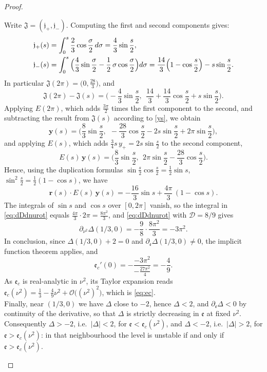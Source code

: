 \documentclass[10pt,a4paper]{amsart}
\newcommand{\D}{\mathcal{D}}
\newcommand{\ee}{\mathfrak{e}}
\begin{document}
\begin{proof}
\begin{enumerate}
\begin{itemize}
Write $\boldsymbol{\mathfrak{J}}=(\mathfrak{j}_+, \mathfrak{j}_-)$. Computing the first and second components gives:
\[
\begin{aligned}
\mathfrak{j}_+(s)&=\int_0^s\frac{2}{3}\cos\frac{\sigma}{2}\,{\rm d}\sigma=\frac{4}{3}\sin\frac{s}{2},\\
\mathfrak{j}_-(s)
&=\int_0^s\Big( \frac{4}{3}\sin\frac{\sigma}{2}-\frac{1}{2}\,\sigma\cos\frac{\sigma}{2}\Big){\rm d}\sigma=\frac{14}{3}\Big(1-\cos\frac{s}{2}\Big)-s\sin\frac{s}{2} .
\end{aligned}
\]
In particular $\boldsymbol{\mathfrak{J}}(2\pi)=\big(0,\frac{28}{3}\big)$, and
\[
\boldsymbol{\mathfrak{J}}(2\pi)-\boldsymbol{\mathfrak{J}}(s)=\Big(-\frac{4}{3}\sin\frac{s}{2},\ \ \frac{14}{3}+\frac{14}{3}\cos\frac{s}{2}+s\sin\frac{s}{2}\Big).
\]
Applying $E(2\pi)$, which adds $\frac{3\pi}{2}$ times the first component to the second, and subtracting the result from $\boldsymbol{\mathfrak{J}}(s)$ according to \eqref{ys}, we obtain
\[
\mathbf y(s)=\Big(\frac{8}{3}\sin\frac{s}{2},\ \ -\frac{28}{3}\cos\frac{s}{2}-2s\sin\frac{s}{2}+2\pi\sin\frac{s}{2}\Big),
\]
and applying $E(s)$, which adds $\frac{3}{4} s\,y_+=2s\sin\frac{s}{2}$ to the second component,
\[
E(s)\,\mathbf y(s)=\Big(\frac{8}{3}\sin\frac{s}{2},\ \ 2\pi\sin\frac{s}{2}-\frac{28}{3}\cos\frac{s}{2}\Big).
\]
 Hence, using the duplication formulas $\sin\frac{s}{2}\cos\frac{s}{2}=\frac{1}{2}\sin s$, $\sin^2\frac{s}{2}=\frac{1}{2}(1-\cos s)$, we have
\[
\mathbf r(s)\cdot E(s)\,\mathbf y(s)=-\frac{16}{3}\sin s+\frac{4\pi}{3}\,(1-\cos s).
\]
The integrals of $\sin s$ and $\cos s$ over $[0,2\pi]$ vanish, so the integral in \eqref{eq:dDdnurot} equals $\frac{4\pi}{3}\cdot2\pi=\frac{8\pi^2}{3}$, and \eqref{eq:dDdnurot} with $\D=8/9$ gives
\begin{equation}\label{eq:dDdnu2}
\partial_{\nu^2}\Delta(1/3,0)=-\frac98\cdot\frac{8\pi^2}{3}=-3\pi^2 .
\end{equation}
In conclusion, since $\Delta(1/3,0)+2=0$ and $\partial_\ee\Delta(1/3,0)\neq0$, the implicit function theorem applies, and
\begin{equation}
\ee_c'(0)=-\frac{-3\pi^2}{-\frac{27\pi^2}{4}}=-\frac49.
\end{equation}
As $\ee_c$ is real-analytic in $\nu^2$, its Taylor expansion reads $\ee_c(\nu^2)=\frac13-\frac49\nu^2+\mathcal{O}\big((\nu^2)^2\big)$, which is \eqref{eq:ec}.\\
Finally, near $(1/3,0)$ we have $\Delta$ close to $-2$, hence $\Delta<2$, and $\partial_\ee\Delta<0$ by continuity of the derivative, so that $\Delta$ is strictly decreasing in $\ee$ at fixed $\nu^2$. Consequently $\Delta>-2$, i.e.\ $|\Delta|<2$, for $\ee<\ee_c(\nu^2)$, and $\Delta<-2$, i.e.\ $|\Delta|>2$, for $\ee>\ee_c(\nu^2)$: in that neighbourhood the level is unstable if and only if $\ee>\ee_c(\nu^2)$.

\end{itemize}
\end{enumerate}
\end{proof}
\end{document}
